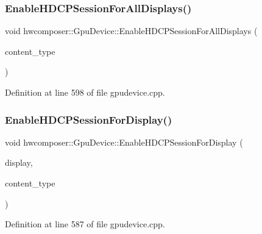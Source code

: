 \subsubsection{\texorpdfstring{Enable\+H\+D\+C\+P\+Session\+For\+All\+Displays()}{EnableHDCPSessionForAllDisplays()}}
{\footnotesize\ttfamily void hwcomposer\+::\+Gpu\+Device\+::\+Enable\+H\+D\+C\+P\+Session\+For\+All\+Displays (\begin{DoxyParamCaption}\item[{H\+W\+C\+Content\+Type}]{content\+\_\+type }\end{DoxyParamCaption})}



Definition at line 598 of file gpudevice.\+cpp.


\begin{DoxyCode}{0}
\end{DoxyCode}
\mbox{\label{classhwcomposer_1_1GpuDevice_aa558c97ab2f80eac47ede0a788a59a28}} 
\subsubsection{\texorpdfstring{Enable\+H\+D\+C\+P\+Session\+For\+Display()}{EnableHDCPSessionForDisplay()}}
{\footnotesize\ttfamily void hwcomposer\+::\+Gpu\+Device\+::\+Enable\+H\+D\+C\+P\+Session\+For\+Display (\begin{DoxyParamCaption}\item[{uint32\+\_\+t}]{display,  }\item[{H\+W\+C\+Content\+Type}]{content\+\_\+type }\end{DoxyParamCaption})}



Definition at line 587 of file gpudevice.\+cpp.


